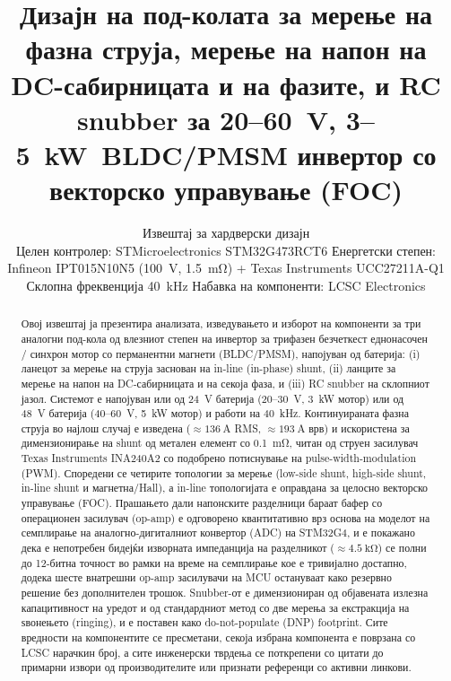 \documentclass[journal,onecolumn,11pt]{IEEEtran}
\begin{document}
\title{Дизајн на под-колата за мерење на фазна струја, мерење на напон на
DC-сабирницата и на фазите, и RC snubber за \mbox{20--\SI{60}{\volt}},
\mbox{3--\SI{5}{\kilo\watt} BLDC/PMSM} инвертор со векторско управување (FOC)}

\author{Извештај за хардверски дизајн\\
\small Целен контролер: STMicroelectronics STM32G473RCT6 \quad
Енергетски степен: Infineon IPT015N10N5 (\SI{100}{\volt}, \SI{1.5}{\milli\ohm}) +
Texas Instruments UCC27211A-Q1\\
\small Склопна фреквенција \SI{40}{\kilo\hertz} \quad Набавка на компоненти: LCSC Electronics}


\maketitle

\begin{abstract}
Овој извештај ја презентира анализата, изведувањето и изборот на компоненти за три
аналогни под-кола од влезниот степен на инвертор за трифазен безчеткест еднонасочен /
синхрон мотор со перманентни магнети (BLDC/PMSM), напојуван од батерија: (i) ланецот за
мерење на струја заснован на in-line (in-phase) shunt, (ii) ланците за мерење на напон на
DC-сабирницата и на секоја фаза, и (iii) RC snubber на склопниот јазол. Системот е напојуван
или од \SI{24}{\volt} батерија (\mbox{20--\SI{30}{\volt}}, \SI{3}{\kilo\watt} мотор) или од
\SI{48}{\volt} батерија (\mbox{40--\SI{60}{\volt}}, \SI{5}{\kilo\watt} мотор) и работи на
\SI{40}{\kilo\hertz}. Континуираната фазна струја во најлош случај е изведена
(\(\approx\SI{136}{\ampere}\) RMS, \(\approx\SI{193}{\ampere}\) врв) и искористена за
димензионирање на shunt од метален елемент со \SI{0.1}{\milli\ohm}, читан од струен засилувач
Texas Instruments INA240A2 со подобрено потиснување на pulse-width-modulation (PWM). Споредени
се четирите топологии за мерење (low-side shunt, high-side shunt, in-line shunt и
магнетна/Hall), а in-line топологијата е оправдана за целосно векторско управување (FOC).
Прашањето дали напонските разделници бараат бафер со операционен засилувач (op-amp) е одговорено
квантитативно врз основа на моделот на семплирање на аналогно-дигиталниот конвертор (ADC) на
STM32G4, и е покажано дека е непотребен бидејќи изворната импеданција на разделникот
(\(\approx\SI{4.5}{\kilo\ohm}\)) се полни до 12-битна точност во рамки на време на семплирање
кое е тривијално достапно, додека шесте внатрешни op-amp засилувачи на MCU остануваат како
резервно решение без дополнителен трошок. Snubber-от е димензиониран од објавената излезна
капацитивност на уредот и од стандардниот метод со две мерења за екстракција на ѕвонењето
(ringing), и е поставен како do-not-populate (DNP) footprint. Сите вредности на компонентите
се пресметани, секоја избрана компонента е поврзана со LCSC нарачкин број, а сите инженерски
тврдења се поткрепени со цитати до примарни извори од производителите или признати референци со
активни линкови.
\end{abstract}
\end{document}
